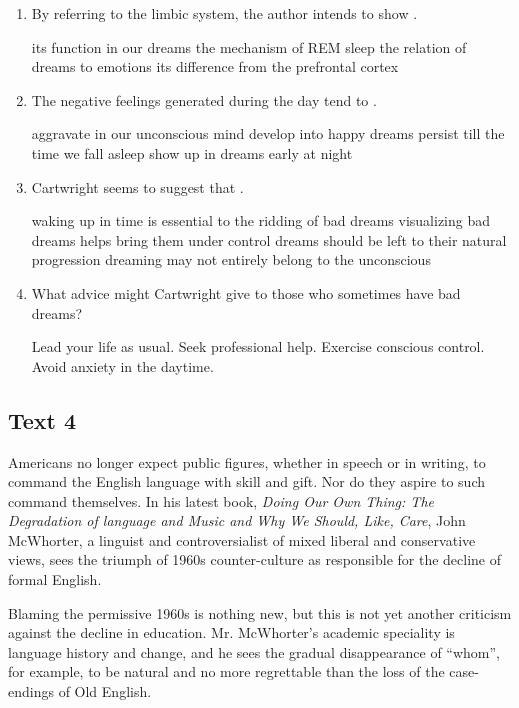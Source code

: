 {\begin{enumerate}[resume]
\item
By referring to the limbic system, the author intends to
show \lineread.


\fourchoices
{its function in our dreams}
{the mechanism of REM sleep}
{the relation of dreams to emotions}
{its difference from the prefrontal cortex}



\item
The negative feelings generated during the day tend to \lineread.


\fourchoices
{aggravate in our unconscious mind}
{develop into happy dreams}
{persist till the time we fall asleep}
{show up in dreams early at night}


\item
Cartwright seems to suggest that \lineread.


\fourchoices
{waking up in time is essential to the ridding of bad dreams}
{visualizing bad dreams helps bring them under control}
{dreams should be left to their natural progression}
{dreaming may not entirely belong to the unconscious}


\item
What advice might Cartwright give to those who sometimes
have bad dreams?


\fourchoices
{Lead your life as usual.}
{Seek professional help.}
{Exercise conscious control.}
{Avoid anxiety in the daytime.}


	
\end{enumerate}


\newpage
\subsection{Text 4}


Americans no longer expect public figures, whether in speech or in
writing, to command the English language with skill and gift. Nor do
they aspire to such command themselves. In his latest book, \emph{Doing
	Our Own Thing: The Degradation of language and Music and Why We Should,
	Like, Care}, John McWhorter, a linguist and controversialist of mixed
liberal and conservative views, sees the triumph of 1960s
counter-culture as responsible for the decline of formal English.

Blaming the permissive 1960s is nothing new, but this is not yet another
criticism against the decline in education. Mr. McWhorter's academic
speciality is language history and change, and he sees the gradual
disappearance of ``whom'', for example, to be natural and no more
regrettable than the loss of the case-endings of Old English.

}
